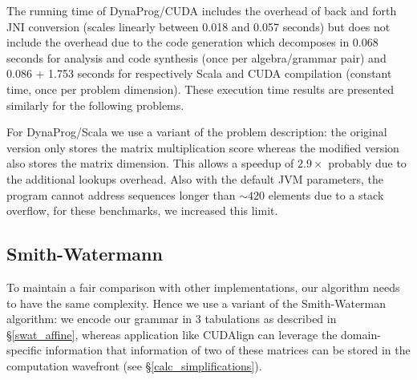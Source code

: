 The running time of DynaProg/CUDA includes the overhead of back and forth JNI conversion (scales linearly between 0.018 and 0.057 seconds) but does not include the overhead due to the code generation which decomposes in 0.068 seconds for analysis and code synthesis (once per algebra/grammar pair) and 0.086 + 1.753 seconds for respectively Scala and CUDA compilation (constant time, once per problem dimension). These execution time results are presented similarly for the following problems.

For DynaProg/Scala we use a variant of the problem description: the original version only stores the matrix multiplication score whereas the modified version also stores the matrix dimension. This allows a speedup of $2.9\times$ probably due to the additional lookups overhead. Also with the default JVM parameters, the program cannot address sequences longer than $\sim 420$ elements due to a stack overflow, for these benchmarks, we increased this limit.

\subsection{Smith-Watermann}
To maintain a fair comparison with other implementations, our algorithm needs to have the same complexity. Hence we use a variant of the Smith-Waterman algorithm: we encode our grammar in 3 tabulations as described in \S\ref{swat_affine}, whereas application like CUDAlign can leverage the domain-specific information that information of two of these matrices can be stored in the computation wavefront (see \S\ref{calc_simplifications}).

